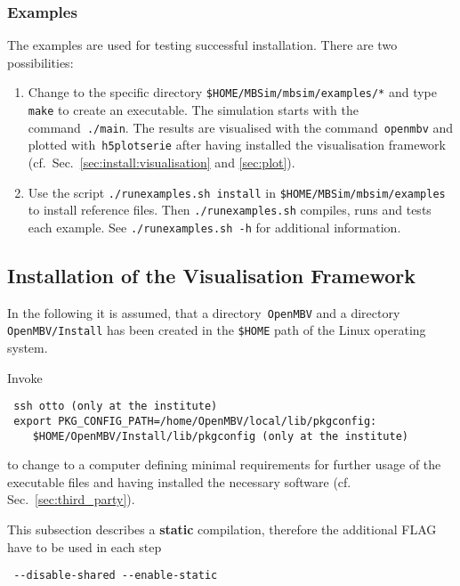 \subsubsection{\MBSim Examples}
The examples are used for testing successful installation. There are two possibilities:
\begin{enumerate}
\item Change to the specific directory \texttt{\$HOME/MBSim/mbsim/examples/*} and type \texttt{make} to create an executable. The simulation starts with the command~\texttt{./main}. The results are visualised with the command~\texttt{openmbv} and plotted with~\texttt{h5plotserie} after having installed the visualisation framework (cf.~Sec.~\ref{sec:install:visualisation} and \ref{sec:plot}).
\item Use the script \texttt{./runexamples.sh install} in \texttt{\$HOME/MBSim/mbsim/examples} to install reference files. Then \texttt{./runexamples.sh} compiles, runs and tests each example. See \texttt{./runexamples.sh -h} for additional information.
\end{enumerate}

\subsection{Installation of the Visualisation Framework\label{sec:install:visualisation}}
In the following it is assumed, that a directory~\texttt{OpenMBV} and a directory \texttt{OpenMBV/Install} has been created in the \texttt{\$HOME} path of the Linux operating system.\par
%
Invoke 
\begin{verbatim}
 ssh otto (only at the institute)
 export PKG_CONFIG_PATH=/home/OpenMBV/local/lib/pkgconfig:
    $HOME/OpenMBV/Install/lib/pkgconfig (only at the institute)
\end{verbatim}
to change to a computer defining minimal requirements for further usage of the executable files and having installed the necessary software (cf. Sec.~\ref{sec:third_party}).

This subsection describes a \textbf{static} compilation, therefore the additional FLAG have to be used in each step
\begin{verbatim}
 --disable-shared --enable-static
\end{verbatim}


